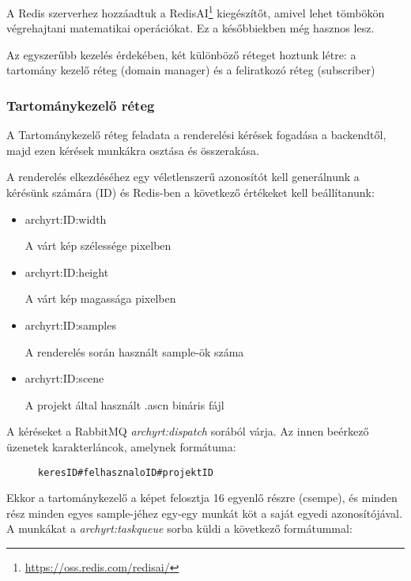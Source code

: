 A Redis szerverhez hozzáadtuk a RedisAI\footnote{\url{https://oss.redis.com/redisai/}} kiegészítőt, amivel lehet tömbökön végrehajtani matematikai operációkat. Ez a későbbiekben még hasznos lesz.

Az egyszerűbb kezelés érdekében, két különböző réteget hoztunk létre: a tartomány kezelő réteg (domain manager) és a feliratkozó réteg (subscriber)

\subsubsection{Tartománykezelő réteg}
A Tartománykezelő réteg feladata a renderelési kérések fogadása a backendtől, majd ezen kérések munkákra osztása és összerakása.

A renderelés elkezdéséhez egy véletlenszerű azonosítót kell generálnunk a kérésünk számára (ID) és Redis-ben a következő értékeket kell beállítanunk:

\begin{itemize}
    \item archyrt:ID:width

          A várt kép szélessége pixelben
    \item archyrt:ID:height

          A várt kép magassága pixelben
    \item archyrt:ID:samples

          A renderelés során használt sample-ök száma
    \item archyrt:ID:scene

          A projekt által használt .ascn bináris fájl
\end{itemize}

A kéréseket a RabbitMQ \emph{archyrt:dispatch} sorából várja. Az innen beérkező üzenetek karakterláncok, amelynek formátuma:

\begin{figure}[h]
    \centering
    \begin{minipage}{.7\textwidth}
        \begin{lstlisting}
keresID#felhasznaloID#projektID
\end{lstlisting}
    \end{minipage}
\end{figure}

Ekkor a tartománykezelő a képet felosztja 16 egyenlő részre (csempe), és minden rész minden egyes sample-jéhez egy-egy munkát köt a saját egyedi azonosítójával. A munkákat a \emph{archyrt:taskqueue} sorba küldi a következő formátummal:

